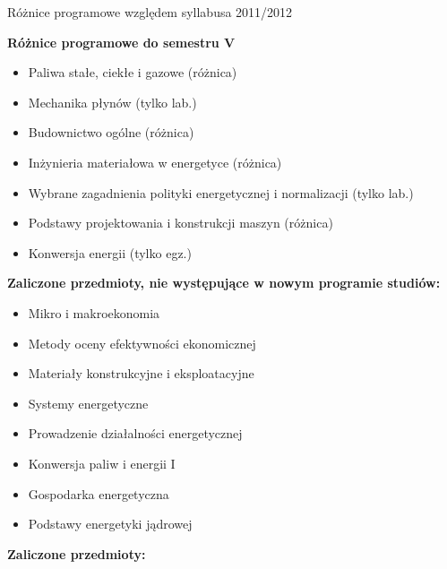 \documentclass[a4paper,12pt]{article}
\begin{document}
\begin{center}
\Large{Różnice programowe względem syllabusa 2011/2012}
\end{center}
\vspace{20pt}
\textbf{Różnice programowe do semestru V}
\begin{itemize}
\item Paliwa stałe, ciekłe i gazowe (różnica)
\item Mechanika płynów (tylko lab.)
\item Budownictwo ogólne (różnica)
\item Inżynieria materiałowa w energetyce (różnica)
\item Wybrane zagadnienia polityki energetycznej i normalizacji (tylko lab.)
\item Podstawy projektowania i konstrukcji maszyn (różnica)
\item Konwersja energii (tylko egz.)
\end{itemize}
\vspace{20pt}
\textbf{Zaliczone przedmioty, nie występujące w nowym programie studiów:}
\begin{itemize}
\item Mikro i makroekonomia
\item Metody oceny efektywności ekonomicznej
\item Materiały konstrukcyjne i eksploatacyjne
\item Systemy energetyczne
\item Prowadzenie działalności energetycznej
\item Konwersja paliw i energii I
\item Gospodarka energetyczna
\item Podstawy energetyki jądrowej
\end{itemize}
\newpage
\textbf{Zaliczone przedmioty:}
\end{document}
